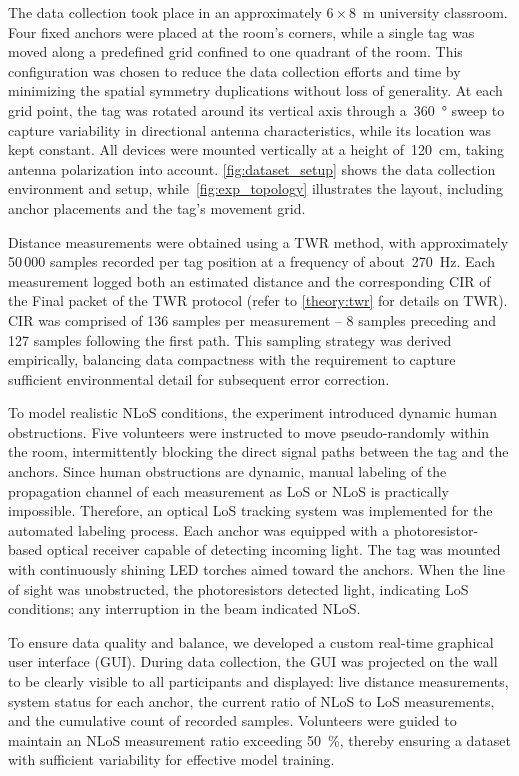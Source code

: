 The data collection took place in an approximately $6 \times 8$~\si{\meter} university classroom. Four fixed anchors were placed at the room's corners, while a single tag was moved along a predefined grid confined to one quadrant of the room. This configuration was chosen to reduce the data collection efforts and time by minimizing the spatial symmetry duplications without loss of generality. At each grid point, the tag was rotated around its vertical axis through a~\SI{360}{\degree} sweep to capture variability in directional antenna characteristics, while its location was kept constant. All devices were mounted vertically at a height of~\SI{120}{\centi\metre}, taking antenna polarization into account. \autoref{fig:dataset_setup} shows the data collection environment and setup, while~\autoref{fig:exp_topology} illustrates the layout, including anchor placements and the tag’s movement grid.

Distance measurements were obtained using a TWR method, with approximately 50\,000 samples recorded per tag position at a frequency of about~\SI{270}{\hertz}. Each measurement logged both an estimated distance and the corresponding CIR of the Final packet of the TWR protocol (refer to \autoref{theory:twr} for details on TWR). CIR was comprised of 136 samples per measurement -- 8 samples preceding and 127 samples following the first path. This sampling strategy was derived empirically, balancing data compactness with the requirement to capture sufficient environmental detail for subsequent error correction.

To model realistic NLoS conditions, the experiment introduced dynamic human obstructions. Five volunteers were instructed to move pseudo-randomly within the room, intermittently blocking the direct signal paths between the tag and the anchors. Since human obstructions are dynamic, manual labeling of the propagation channel of each measurement as LoS or NLoS is practically impossible. Therefore, an optical LoS tracking system was implemented for the automated labeling process. Each anchor was equipped with a photoresistor-based optical receiver capable of detecting incoming light. The tag was mounted with continuously shining LED torches aimed toward the anchors. When the line of sight was unobstructed, the photoresistors detected light, indicating LoS conditions; any interruption in the beam indicated NLoS.

To ensure data quality and balance, we developed a custom real-time graphical user interface (GUI). During data collection, the GUI was projected on the wall to be clearly visible to all participants and displayed: live distance measurements, system status for each anchor, the current ratio of NLoS to LoS measurements, and the cumulative count of recorded samples. Volunteers were guided to maintain an NLoS measurement ratio exceeding \SI{50}{\percent}, thereby ensuring a dataset with sufficient variability for effective model training.

